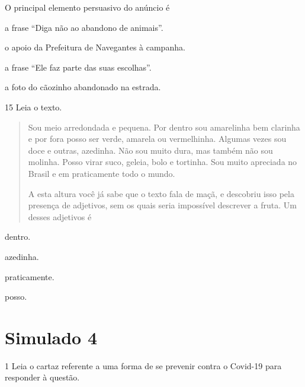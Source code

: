 O principal elemento persuasivo do anúncio é

\begin{escolha}
\item a frase ``Diga não ao abandono de animais''.

\item o apoio da Prefeitura de Navegantes à campanha.

\item a frase ``Ele faz parte das suas escolhas''.

\item a foto do cãozinho abandonado na estrada.
\end{escolha}


\num{15} Leia o texto.

\begin{quote}
Sou meio arredondada e pequena. Por dentro sou amarelinha bem clarinha e
por fora posso ser verde, amarela ou vermelhinha. Algumas vezes sou doce
e outras, azedinha. Não sou muito dura, mas também não sou molinha.
Posso virar suco, geleia, bolo e tortinha. Sou muito apreciada no Brasil
e em praticamente todo o mundo.

A esta altura você já sabe que o texto fala de maçã, e descobriu isso
pela presença de adjetivos, sem os quais seria impossível descrever a
fruta. Um desses adjetivos é
\end{quote}

\begin{escolha}
\item dentro.

\item azedinha.

\item praticamente.

\item posso.
\end{escolha}

\chapter{Simulado 4}

\num{1} Leia o cartaz referente a uma forma de se prevenir contra o Covid-19
para responder à questão.


